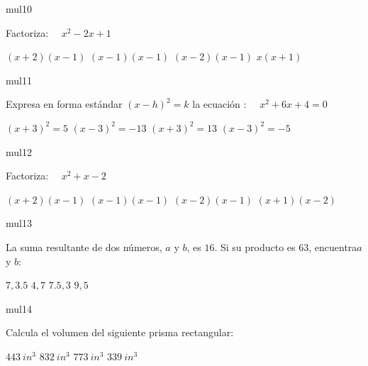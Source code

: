 \documentclass[a4paper]{article}
\begin{document}
\begin{question}{mul10}

            Factoriza:  \ \ \(x^2 -2x +1 \)
        \begin{choices}
            \choice $(x+2)(x -1)$
            \choice $(x-1)(x-1)$
            \choice $(x-2)(x-1)$
            \choice $x(x+1)$
        \end{choices}
         
\end{question}

\begin{question}{mul11}

        Expresa en forma estándar \((x-h)^2 = k\) la ecuación : \ \ \(x^2 + 6x +4 = 0\)
        
 \begin{choices}
            \choice $(x+3)^2 = 5$
            \choice $(x-3)^2 = -13$
            \choice $(x+3)^2 = 13$
            \choice $(x-3)^2 = -5$
\end{choices}
        
\end{question}

\begin{question}{mul12}
         
            Factoriza:  \ \ \(x^2+x -2 \)
        \begin{choices}
            \choice $(x+2)(x -1)$
            \choice $(x-1)(x-1)$
            \choice $(x-2)(x-1)$
            \choice $(x+1)(x-2)$
        \end{choices}
        
\end{question}

\begin{question}{mul13}

La suma resultante de dos números, \(a\) y \(b\), es \(16\). Si su producto es \(63\), encuentra\(a\) y \(b\):

    \begin{choices}
         \choice \(7, 3.5\)
         \choice \(4,7\)
         \choice \(7.5, 3\)
         \choice \(9, 5\)
    \end{choices}
\vspace{0.2in}
\end{question}

\begin{question}{mul14}

Calcula el volumen del siguiente prisma rectangular:

        \begin{choices}
            \choice $443 \ in^3$ 
            \choice $832  \ in^3$
            \choice $773  \ in^3$
            \choice $339  \ in^3$
        \end{choices}
  
\end{question}
\end{document}
